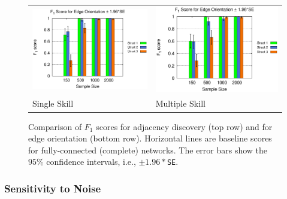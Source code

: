\documentclass{edm_template}
\begin{document}
\begin{figure}[ht]
\begin{center}
\begin{tabular}{>{\centering}m{1.5in} >{\centering\arraybackslash}m{1.5in}}
				\includegraphics[width=1.1\linewidth]{figures/F1O_single.eps} &\includegraphics[width=1.1\linewidth]{figures/F1O_multi.eps}\\
				Single Skill& Multiple Skill
			\end{tabular}
		\end{center}
		\vspace{-1em}
		\caption{Comparison of $F_1$ scores for adjacency discovery (top row) and for edge orientation (bottom row). 
			Horizontal lines are baseline scores for fully-connected (complete) networks.
			The error bars show the $95\%$ confidence intervals, i.e., $\pm 1.96*$\texttt{SE}.} 
		\label{fig:f1-single-multi}
	\end{figure} 

	
	\subsubsection{Sensitivity to Noise}	
	
\end{document}
